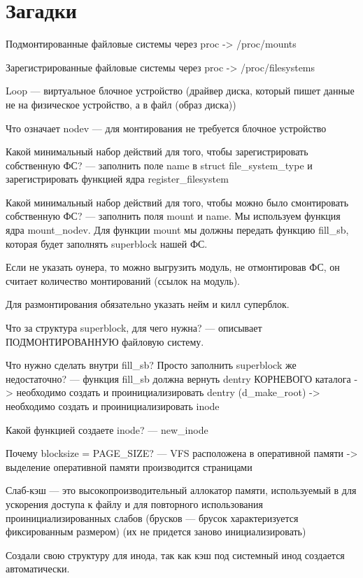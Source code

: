 \section*{Загадки}

Подмонтированные файловые системы через proc -> /proc/mounts

Зарегистрированные файловые системы через proc -> /proc/filesystems

Loop --- виртуальное блочное устройство (драйвер диска, который пишет данные не на физическое устройство, а в файл (образ диска))

Что означает nodev --- для монтирования не требуется блочное устройство

Какой минимальный набор действий для того, чтобы зарегистрировать собственную ФС? --- заполнить поле name в struct file\_system\_type и зарегистрировать функцией ядра register\_filesystem
    
Какой минимальный набор действий для того, чтобы можно было смонтировать
   собственную ФС? --- заполнить поля mount и name. Мы используем функция ядра mount\_nodev. Для функции mount мы должны передать функцию fill\_sb, которая будет заполнять superblock нашей ФС.
   
Если не указать оунера, то можно выгрузить модуль, не отмонтировав ФС, он считает количество монтирований (ссылок на модуль).

Для размонтирования обязательно указать нейм и килл суперблок.
   
Что за структура superblock, для чего нужна? --- описывает ПОДМОНТИРОВАННУЮ файловую систему.

Что нужно сделать внутри fill\_sb? Просто заполнить superblock же недостаточно? --- функция fill\_sb должна вернуть dentry КОРНЕВОГО каталога -> необходимо создать и проинициализировать dentry (d\_make\_root) -> необходимо создать и проинициализировать inode

Какой функцией создаете inode? --- new\_inode

Почему blocksize = PAGE\_SIZE? --- VFS расположена в оперативной памяти -> выделение оперативной памяти производится страницами

Слаб-кэш --- это высокопроизводительный аллокатор памяти, используемый в для ускорения доступа к файлу и для повторного использования проинициализированных слабов (брусков --- брусок характеризуется фиксированным размером) (их не придется заново инициализировать)

Создали свою структуру для инода, так как кэш под системный инод создается автоматически.
 
